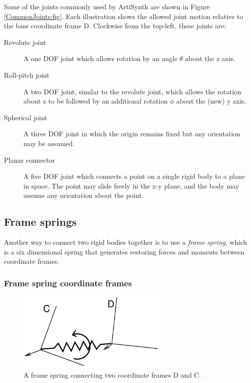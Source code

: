 Some of the joints commonly used by ArtiSynth are shown in Figure
\ref{CommonJoints:fig}. Each illustration shows the allowed joint
motion relative to the base coordinate frame D. Clockwise
from the top-left, these joints are:

\begin{description}

\item[Revolute joint]\mbox{}

A one DOF joint which allows rotation by an angle $\theta$ about
the z axis.

\item[Roll-pitch joint]\mbox{}

A two DOF joint, similar to the revolute joint, which allows the
rotation about z to be followed by an additional rotation $\phi$ about
the (new) y axis.

\item[Spherical joint]\mbox{}

A three DOF joint in which the origin remains fixed but any orientation
may be assumed.

\item[Planar connector]\mbox{}

A five DOF joint which connects a point on a single rigid body to a
plane in space. The point may slide freely in the x-y plane, and the
body may assume any orientation about the point.

\end{description}


\subsection{Frame springs}
\label{FrameSprings:sec}

Another way to connect two rigid bodies together is to use a {\it
frame spring}, which is a six dimensional spring that generates
restoring forces and moments between coordinate frames.

\subsubsection{Frame spring coordinate frames}

\begin{figure}[ht]
\begin{center}
 \includegraphics[width=3in]{images/frameSpring}
\end{center}
\caption{A frame spring connecting two coordinate frames D and C.}
\label{frameSpring:fig}
\end{figure}

